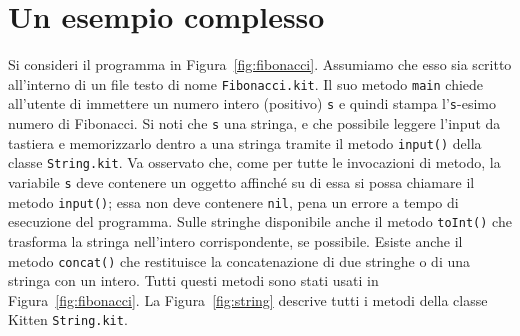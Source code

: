 \section{Un esempio \piu complesso}\label{sec:fibonacci}
%
Si consideri il programma in Figura~\ref{fig:fibonacci}. Assumiamo che esso
sia scritto all'interno di un file testo di nome \texttt{Fibonacci.kit}.
Il suo metodo \texttt{main} chiede all'utente di immettere un numero intero
(positivo) \texttt{s} e quindi stampa l'\texttt{s}-esimo numero di Fibonacci.
Si noti che \texttt{s} \e una stringa, e che \e possibile leggere l'input da
tastiera e memorizzarlo dentro a una stringa tramite il metodo
\texttt{input()} della classe \texttt{String.kit}. Va osservato che, come
per tutte le invocazioni di metodo, la variabile \texttt{s} deve contenere
un oggetto affinch\'e su di essa si possa chiamare
il metodo \texttt{input()}; essa non deve contenere \texttt{nil}, pena
un errore a tempo di esecuzione del programma.
Sulle stringhe \e disponibile anche il metodo \texttt{toInt()} che trasforma
la stringa nell'intero corrispondente, se possibile. Esiste anche il metodo
\texttt{concat()} che restituisce la concatenazione di due stringhe o di
una stringa con un intero. Tutti questi metodi sono stati usati in
Figura~\ref{fig:fibonacci}. La Figura~\ref{fig:string} descrive tutti i
metodi della classe Kitten \texttt{String.kit}.
%
